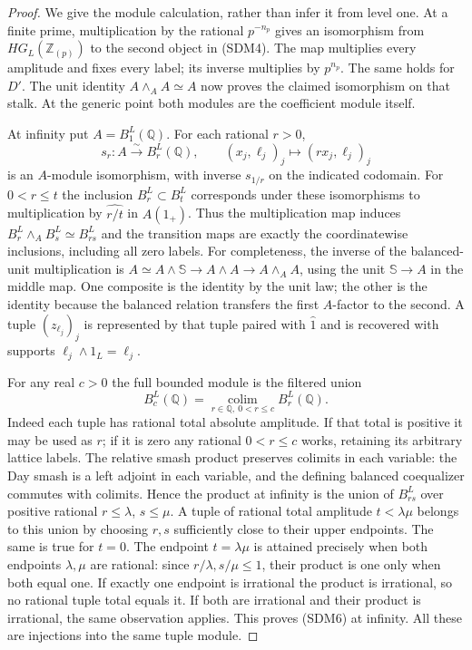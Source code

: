 \begin{proof}
We give the module calculation, rather than infer it from level one.
At a finite prime, multiplication by the rational $p^{-n_p}$ gives
an isomorphism from $HG_L(\mathbb Z_{(p)})$ to the second object
in (SDM4). The map multiplies every amplitude and fixes every label;
its inverse multiplies by $p^{n_p}$. The same holds for $D'$.
The unit identity $A\wedge_A A\simeq A$ now proves the claimed
isomorphism on that stalk. At the generic point both modules are
the coefficient module itself.

At infinity put $A=B_1^L(\mathbb Q)$. For each rational $r>0$,
\begin{equation}\tag{SDM7}
 s_r:A\xrightarrow{\sim}B_r^L(\mathbb Q),\qquad
 (x_j,\ell_j)_j\longmapsto(r x_j,\ell_j)_j
\end{equation}
is an $A$-module isomorphism, with inverse $s_{1/r}$ on the indicated
codomain. For $0<r\le t$ the inclusion $B_r^L\subset B_t^L$
corresponds under these isomorphisms to multiplication by
$\widehat{r/t}$ in $A(1_+)$. Thus the multiplication map induces
$B_r^L\wedge_A B_s^L\simeq B_{rs}^L$ and the transition maps are
exactly the coordinatewise inclusions, including all zero labels.
For completeness, the inverse of the balanced-unit multiplication
is $A\simeq A\wedge\mathbb S\to A\wedge A\to A\wedge_A A$,
using the unit $\mathbb S\to A$ in the middle map. One composite
is the identity by the unit law; the other is the identity because
the balanced relation transfers the first $A$-factor to the second.
A tuple $(z_{\ell_j})_j$ is represented by that tuple paired with
$\widehat1$ and is recovered with supports $\ell_j\wedge1_L=\ell_j$.

For any real $c>0$ the full bounded module is the filtered union
\begin{equation}\tag{SDM8}
 B_c^L(\mathbb Q)=\underset{r\in\mathbb Q,\ 0<r\le c}{\operatorname{colim}}
 B_r^L(\mathbb Q).
\end{equation}
Indeed each tuple has rational total absolute amplitude. If that
total is positive it may be used as $r$; if it is zero any rational
$0<r\le c$ works, retaining its arbitrary lattice labels. The
relative smash product preserves colimits in each variable: the
Day smash is a left adjoint in each variable, and the defining
balanced coequalizer commutes with colimits. Hence the product at
infinity is the union of $B_{rs}^L$ over positive rational
$r\le\lambda$, $s\le\mu$. A tuple of rational total amplitude
$t<\lambda\mu$ belongs to this union by choosing $r,s$ sufficiently
close to their upper endpoints. The same is true for $t=0$.
The endpoint $t=\lambda\mu$ is attained precisely when both
endpoints $\lambda,\mu$ are rational: since $r/\lambda,s/\mu\le1$,
their product is one only when both equal one. If exactly one
endpoint is irrational the product is irrational, so no rational
tuple total equals it. If both are irrational and their product is
irrational, the same observation applies. This proves (SDM6) at
infinity. All these are injections into the same tuple module.


\end{proof}
